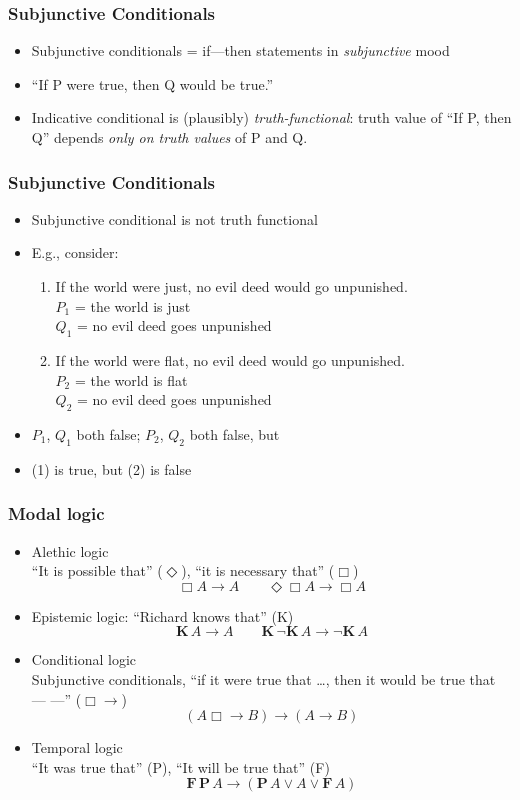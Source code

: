 \begin{frame}
\frametitle{Subjunctive Conditionals}

\begin{itemize}[<+->]
\item Subjunctive conditionals = if---then statements in \emph{subjunctive} mood
\item ``If P were true, then Q would be true.''
\item Indicative conditional is (plausibly) \emph{truth-functional}:
  truth value of ``If P, then Q'' depends \emph{only on truth values}
  of P and Q.
\end{itemize}
\end{frame}

\begin{frame}
\frametitle{Subjunctive Conditionals}

\begin{itemize}[<+->]
\item Subjunctive conditional is not truth functional
\item E.g., consider:
\begin{enumerate}
\item If the world were just, no evil deed would go unpunished.\\
$P_1$ = the world is just\\
$Q_1$ = no evil deed goes unpunished
\item If the world were flat, no evil deed would go unpunished.\\
$P_2$ = the world is flat\\
$Q_2$ = no evil deed goes unpunished
\end{enumerate}
\item $P_1$, $Q_1$ both false; $P_2$, $Q_2$ both false, but
\item (1) is true, but (2) is false
\end{itemize}
\end{frame}

\begin{frame}
    \frametitle{Modal logic}

\begin{itemize}[<+->]
\item Alethic logic\\
``It is possible that'' ($\Diamond$), ``it is necessary that'' ($\Box$)
\[
\Box A \to A \qquad \Diamond\Box A \to \Box A
\]
\item Epistemic logic:
``Richard knows that'' (K)
\[
\textbf{K}\, A \to A \qquad \textbf{K}\,\lnot \textbf{K}\, A \to \lnot \textbf{K}\, A
\]
\item Conditional logic\\
Subjunctive conditionals, ``if it were true that \dots, then it would be true that --- ---'' ($\Box\!\!\to$)
\[
(A \mathrel{\Box\!\!\to} B) \to (A \to B)
\]
\item Temporal logic\\
``It was true that'' (P), ``It will be true that'' (F)
\[
\textbf{F}\,\textbf{P}\, A \to (\textbf{P}\, A \lor A \lor \textbf{F}\, A)
\]
\end{itemize}

\end{frame}

